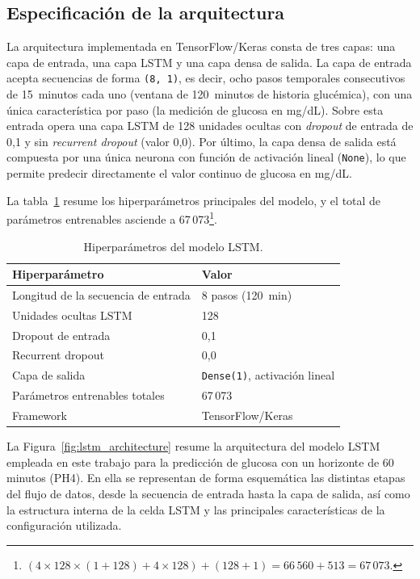 \subsection{Especificación de la arquitectura}
\label{subsec:arquitectura_especificacion}

La arquitectura implementada en TensorFlow/Keras consta de tres capas: una capa de entrada, una capa LSTM y una capa densa de salida. La capa de entrada acepta secuencias de forma \texttt{(8,~1)}, es decir, ocho pasos temporales consecutivos de 15~minutos cada uno (ventana de 120~minutos de historia glucémica), con una única característica por paso (la medición de glucosa en mg/dL). Sobre esta entrada opera una capa LSTM de 128 unidades ocultas con \textit{dropout} de entrada de 0,1 y sin \textit{recurrent dropout} (valor 0,0). Por último, la capa densa de salida está compuesta por una única neurona con función de activación lineal (\texttt{None}), lo que permite predecir directamente el valor continuo de glucosa en mg/dL.

La tabla~\ref{tab:hiperparametros_lstm} resume los hiperparámetros principales del modelo, y el total de parámetros entrenables asciende a 67\,073\footnote{$(4 \times 128 \times (1 + 128) + 4 \times 128) + (128 + 1) = 66\,560 + 513 = 67\,073$.}.

\begin{table}[htbp]
\centering
\caption{Hiperparámetros del modelo LSTM.}
\label{tab:hiperparametros_lstm}
\begin{tabular}{ll}
\hline
\textbf{Hiperparámetro}   & \textbf{Valor} \\
\hline
Longitud de la secuencia de entrada & 8 pasos (120~min) \\
Unidades ocultas LSTM               & 128 \\
Dropout de entrada                  & 0,1 \\
Recurrent dropout                   & 0,0 \\
Capa de salida                      & \texttt{Dense(1)}, activación lineal \\
Parámetros entrenables totales      & 67\,073 \\
Framework                           & TensorFlow/Keras \\
\hline
\end{tabular}
\end{table}

La Figura~\ref{fig:lstm_architecture} resume la arquitectura del modelo LSTM empleada en este trabajo para la predicción de glucosa con un horizonte de 60 minutos (PH4). En ella se representan de forma esquemática las distintas etapas del flujo de datos, desde la secuencia de entrada hasta la capa de salida, así como la estructura interna de la celda LSTM y las principales características de la configuración utilizada.



